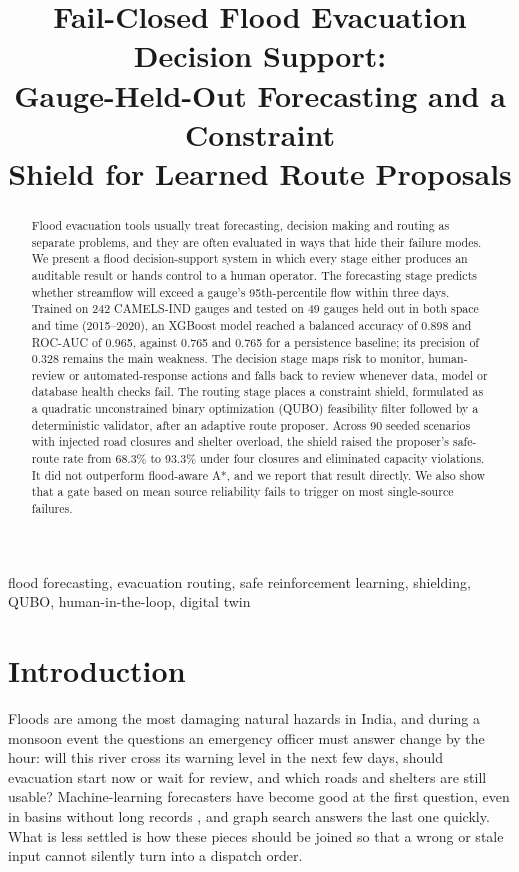 \documentclass[conference]{IEEEtran}
\begin{document}
\title{Fail-Closed Flood Evacuation Decision Support:\\
Gauge-Held-Out Forecasting and a Constraint\\
Shield for Learned Route Proposals}

\author{
}

\maketitle

\begin{abstract}
Flood evacuation tools usually treat forecasting, decision making and routing as separate problems, and they are often evaluated in ways that hide their failure modes. We present a flood decision-support system in which every stage either produces an auditable result or hands control to a human operator. The forecasting stage predicts whether streamflow will exceed a gauge's 95th-percentile flow within three days. Trained on 242 CAMELS-IND gauges and tested on 49 gauges held out in both space and time (2015--2020), an XGBoost model reached a balanced accuracy of 0.898 and ROC-AUC of 0.965, against 0.765 and 0.765 for a persistence baseline; its precision of 0.328 remains the main weakness. The decision stage maps risk to monitor, human-review or automated-response actions and falls back to review whenever data, model or database health checks fail. The routing stage places a constraint shield, formulated as a quadratic unconstrained binary optimization (QUBO) feasibility filter followed by a deterministic validator, after an adaptive route proposer. Across 90 seeded scenarios with injected road closures and shelter overload, the shield raised the proposer's safe-route rate from 68.3\% to 93.3\% under four closures and eliminated capacity violations. It did not outperform flood-aware A*, and we report that result directly. We also show that a gate based on mean source reliability fails to trigger on most single-source failures.
\end{abstract}

\begin{IEEEkeywords}
flood forecasting, evacuation routing, safe reinforcement learning, shielding, QUBO, human-in-the-loop, digital twin
\end{IEEEkeywords}

\section{Introduction}
Floods are among the most damaging natural hazards in India, and during a monsoon event the questions an emergency officer must answer change by the hour: will this river cross its warning level in the next few days, should evacuation start now or wait for review, and which roads and shelters are still usable? Machine-learning forecasters have become good at the first question, even in basins without long records \cite{Nearing2024}, and graph search answers the last one quickly. What is less settled is how these pieces should be joined so that a wrong or stale input cannot silently turn into a dispatch order.
\end{document}

